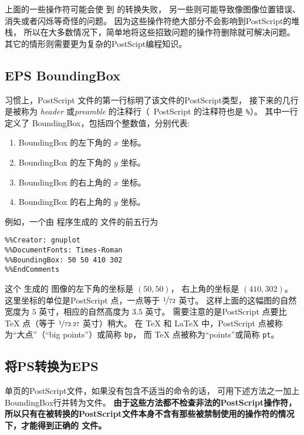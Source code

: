 上面的一些操作符可能会使 到  的转换失败，
另一些则可能导致像图像位置错误、消失或者闪烁等奇怪的问题。
因为这些操作符绝大部分不会影响到PostScript的堆栈，
所以在大多数情况下，简单地将这些招致问题的操作符删除就可解决问题。
其它的情形则需要更为复杂的PostScipt编程知识。

\subsection{EPS BoundingBox}\label{ssec:bbox}

习惯上，PostScript 文件的第一行标明了该文件的PostScript类型，
接下来的几行是被称为 \emph{header} 或\emph{preamble} 的注释行（~PostScript 的注释符也是 \texttt{\%}）。
其中一行定义了 BoundingBox，包括四个整数值，分别代表:
\begin{enumerate}
	\item BoundingBox 的左下角的 $x$ 坐标。
	\item BoundingBox 的左下角的 $y$ 坐标。
	\item BoundingBox 的右上角的 $x$ 坐标。
	\item BoundingBox 的右上角的 $y$ 坐标。
\end{enumerate}

例如，一个由  程序生成的  文件的前五行为
\begin{Verbatim}[frame=single,rulecolor=\color{mygreen},label={\bfseries \file{eps} 文件头示例}]
%!PS-Adobe-2.0 EPSF-2.0
%%Creator: gnuplot
%%DocumentFonts: Times-Roman
%%BoundingBox: 50 50 410 302
%%EndComments
\end{Verbatim}

这个 生成的  图像的左下角的坐标是 $(50,50)$，
右上角的坐标是 $(410,302)$。
这里坐标的单位是PostScript 点，一点等于 $\nicefrac{1}{72}$ 英寸。
这样上面的这幅图的自然宽度为 $5$ 英寸，相应的自然高度为 $3.5$ 英寸。
需要注意的是PostScript 点要比 \TeX{} 点（等于 $\nicefrac{1}{72.27}$ 英寸）稍大。
在 \TeX{} 和 \LaTeX{} 中，PostScript 点被称为“大点”（``big points''）或简称 \texttt{bp}，
而 \TeX{} 点被称为``points''或简称 \texttt{pt}。

\subsection{将PS转换为EPS}\label{ssec:pstoeps}

单页的PostScript文件，如果没有包含不适当的命令的话，
可用下述方法之一加上BoundingBox行并转为文件。
\textbf{由于这些方法都不检查非法的PostScript操作符，
	所以只有在被转换的PostScript文件本身不含有那些被禁制使用的操作符的情况下，才能得到正确的 文件。}

